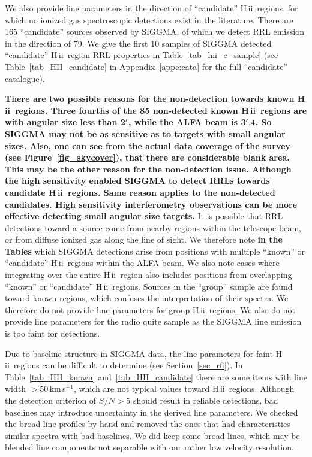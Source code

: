 \documentclass[manuscript]{aastex61}
\newcommand{\hii}{{\rm H\,}{{\sc ii}}}
\newcommand{\kms}{\,km\,s$^{-1}$}
\begin{document}
We also provide line parameters in the direction of ``candidate'' \hii\ regions, for which no ionized gas spectroscopic detections exist in the literature.
There are 165 ``candidate'' sources observed by SIGGMA, of which we detect RRL emission in the direction of 79.
We give the first 10 samples of SIGGMA detected ``candidate'' \hii\ region RRL properties in Table~\ref{tab_hii_c_sample} (see Table~\ref{tab_HII_candidate} in Appendix~\ref{appe:cata} for the full ``candidate'' catalogue).

\textbf{There are two possible reasons for the non-detection towards known \hii\ regions. Three fourths of the 85 non-detected known \hii\ regions are with angular size less than 2$\mbox{$^\prime$}$, while the ALFA beam is 3$\mbox{$^\prime$}.4$. So SIGGMA may not be as sensitive as to targets with small angular sizes. Also, one can see from the actual data coverage of the survey (see Figure~\ref{fig_skycover}), that there are considerable blank area. This may be the other reason for the non-detection issue. 
Although the high sensitivity enabled SIGGMA to detect RRLs towards candidate \hii\ regions. Same reason applies to the non-detected candidates. High sensitivity interferometry observations can be more effective detecting small angular size targets. }
It is possible that RRL detections toward a source come from nearby regions within the telescope beam, or from diffuse ionized gas along the line of sight.
We therefore note \textbf{in the Tables} which SIGGMA detections arise from positions with multiple ``known'' or ``candidate'' \hii\ regions within the ALFA beam.
We also note cases where integrating over the entire \hii\ region also includes positions from overlapping ``known'' or ``candidate'' \hii\ regions.
Sources in the ``group'' sample are found toward known regions, which confuses the interpretation of their spectra.
We therefore do not provide line parameters for group \hii\ regions.
We also do not provide line parameters for the radio quite sample as the SIGGMA line emission is too faint for detections.

Due to baseline structure in SIGGMA data, the line parameters for faint \hii\ regions can be difficult to determine (see Section~\ref{sec_rfi}).
In Table~\ref{tab_HII_known} and~\ref{tab_HII_candidate} there are some items with line width $>50$\kms, which are not typical values toward \hii\ regions. 
Although the detection criterion of $S/N >5$ should result in reliable detections, bad baselines may introduce uncertainty in the derived line parameters.
We checked the broad line profiles by hand and removed the ones that had characteristics similar spectra with bad baselines.
We did keep some broad lines, which may be blended line components not separable with our rather low velocity resolution.
\end{document}
